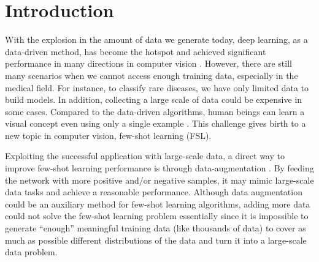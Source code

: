 \documentclass[10pt, conference, compsocconf]{IEEEtran}
\begin{document}
\section{Introduction}
With the explosion in the amount of data we generate today, deep learning, as a data-driven method, has become the hotspot and achieved significant performance in many directions in computer vision  \cite{he2016deep,cen20deep,wu2021,he2021,ma2020,sajid2020}.  However, there are still many scenarios when we cannot access enough training data, especially in the medical field. For instance, to classify rare diseases, we have only limited data to build models. In addition, collecting a large scale of data could be expensive in some cases. Compared to the data-driven algorithms, human beings can learn a visual concept even using only a single example  \cite{schmidt2009meaning}. This challenge gives birth to a new topic in computer vision, few-shot learning (FSL).

Exploiting the successful application with large-scale data, a direct way to improve few-shot learning performance is through data-augmentation \cite{liu2019few,zhang2019few,chen2019image,wang2018low}.  By feeding the network with more positive and/or negative samples, it may mimic large-scale data tasks and achieve a reasonable performance. Although data augmentation could be an auxiliary method for few-shot learning algorithms, adding more data could not solve the few-shot learning problem essentially since it is impossible to generate \enquote{enough} meaningful training data (like thousands of data) to cover as much as possible different distributions of the data and turn it into a large-scale data problem.
\end{document}
